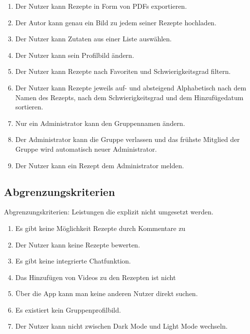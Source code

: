 \documentclass[parskip=full]{scrartcl}
\begin{document}
\begin{enumerate}[start=1,label={$\langle$\bfseries RC\arabic*$\rangle$}, leftmargin = 5em, itemsep=4pt, parsep=4pt]
    \item Der Nutzer kann Rezepte in Form von PDFs exportieren.\label{rc:PDFExport}
    \item Der Autor kann genau ein Bild zu jedem seiner Rezepte hochladen.\label{rc:Images}
    \item Der Nutzer kann Zutaten aus einer Liste auswählen.\label{rc:IngredientList}
    \item Der Nutzer kann sein Profilbild ändern.\label{rc:ProfileImage}
    \item Der Nutzer kann Rezepte nach Favoriten und Schwierigkeitsgrad filtern.\label{rc:Filtering}
    \item Der Nutzer kann Rezepte jeweils auf- und absteigend Alphabetisch nach dem Namen des Rezepts, nach dem Schwierigkeitsgrad und dem Hinzufügedatum sortieren.\label{rc:Sorting}
    \item Nur ein Administrator kann den Gruppennamen ändern.\label{rc:GroupRenaming}
    \item Der Administrator kann die Gruppe verlassen und das frühste Mitglied der Gruppe wird automatisch neuer Administrator.\label{rc:AdminLeaves}
    \item Der Nutzer kann ein Rezept dem Administrator melden.\label{rc:RecipeMelden}

\end{enumerate}

\subsection{Abgrenzungskriterien}
Abgrenzungskriterien: Leistungen die explizit nicht umgesetzt werden.

\begin{enumerate}[start=1,label={$\langle$\bfseries RW\arabic*$\rangle$}, leftmargin = 5em, itemsep=4pt, parsep=4pt]
    \item Es gibt keine Möglichkeit Rezepte durch Kommentare zu
    \item Der Nutzer kann keine Rezepte bewerten.
    \item Es gibt keine integrierte Chatfunktion.
    \item Das Hinzufügen von Videos zu den Rezepten ist nicht
    \item Über die App kann man keine anderen Nutzer direkt suchen.
    \item Es existiert kein Gruppenprofilbild.
    \item Der Nutzer kann nicht zwischen Dark Mode und Light Mode wechseln.
\end{enumerate}
\end{document}
